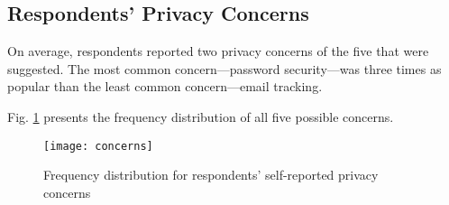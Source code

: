 \documentclass[acmtog]{acmart}
\begin{document}
\subsection{Respondents' Privacy Concerns}
On average, respondents reported two privacy concerns of the five that were
suggested. The most common concern---password security---was three times as
popular than the least common concern---email tracking.

Fig. \ref{Univariate Distribution Respondent Concerns} presents the frequency
distribution of all five possible concerns.

\begin{figure}[H]
    \texttt{[image: concerns]}
    \caption{Frequency distribution for respondents' self-reported privacy
    concerns}
    \label{Univariate Distribution Respondent Concerns}
\end{figure}





\appendix
\end{document}
